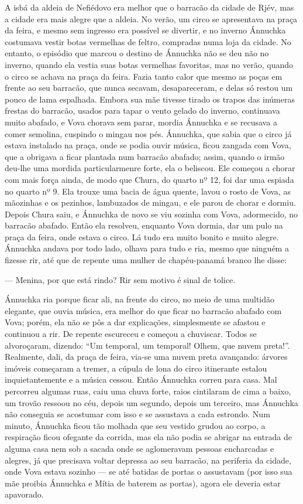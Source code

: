 A isbá da aldeia de Nefiédovo era melhor que o barracão da cidade de
Rjév, mas a cidade era mais alegre que a aldeia. No verão, um circo se
apresentava na praça da feira, e mesmo sem ingresso era possível se
divertir, e no inverno Ánnuchka costumava vestir botas vermelhas de
feltro, compradas numa loja da cidade. No entanto, o episódio que marcou
o destino de Ánnuchka não se deu não no inverno, quando ela vestia suas
botas vermelhas favoritas, mas no verão, quando o circo se achava na
praça da feira. Fazia tanto calor que mesmo as poças em frente ao seu
barracão, que nunca secavam, desapareceram, e delas só restou um pouco
de lama espalhada. Embora sua mãe tivesse tirado os trapos das inúmeras
frestas do barracão, usados para tapar o vento gelado do inverno,
continuava muito abafado, e Vova chorava sem parar, mordia Ánnuchka e se
recusava a comer semolina, cuspindo o mingau nos pés. Ánnuchka, que
sabia que o circo já estava instalado na praça, onde se podia ouvir
música, ficou zangada com Vova, que a obrigava a ficar plantada num
barracão abafado; assim, quando o irmão deu-lhe uma mordida
particularmenre forte, ela o beliscou. Ele começou a chorar com mais
força ainda, de modo que Chura, do quarto nº 12, foi dar uma espiada no
quarto nº 9. Ela trouxe uma bacia de água quente, lavou o rosto de Vova,
as mãozinhas e os pezinhos, lambuzados de mingau, e ele parou de chorar
e dormiu. Depois Chura saiu, e Ánnuchka de novo se viu sozinha com Vova,
adormecido, no barracão abafado. Então ela resolveu, enquanto Vova
dormia, dar um pulo na praça da feira, onde estava o circo. Lá tudo era
muito bonito e muito alegre. Ánnuchka andava por todo lado, olhava para
tudo e ria, mesmo que ninguém a fizesse rir, até que de repente uma
mulher de chapéu-panamá branco lhe disse:

--- Menina, por que está rindo? Rir sem motivo é sinal de tolice.

Ánnuchka ria porque ficar ali, na frente do circo, no meio de uma
multidão elegante, que ouvia música, era melhor do que ficar no barracão
abafado com Vova; porém, ela não se pôs a dar explicações, simplesmente
se afastou e continuou a rir. De repente escureceu e começou a
chuviscar. Todos se alvoroçaram, dizendo: ``Um temporal, um temporal!
Olhem, que nuvem preta!''. Realmente, dali, da praça de feira, via-se
uma nuvem preta avançando: árvores imóveis começaram a tremer, a cúpula
de lona do circo itinerante estalou inquietantemente e a música cessou.
Então Ánnuchka correu para casa. Mal percorreu algumas ruas, caiu uma
chuva forte, raios cintilaram de cima a baixo, um trovão ressoou no céu,
depois um segundo, depois um terceiro, mas Ánnuchka não conseguia se
acostumar com isso e se assustava a cada estrondo. Num minuto, Ánnuchka
ficou tão molhada que seu vestido grudou ao corpo, a respiração ficou
ofegante da corrida, mas ela não podia se abrigar na entrada de alguma
casa nem sob a sacada onde se aglomeravam pessoas encharcadas e alegres,
já que precisava voltar depressa ao seu barracão, na periferia da
cidade, onde Vova estava sozinho --- se até batidas de portas o
assustavam (por isso sua mãe proibia Ánnuchka e Mítia de baterem as
portas), agora ele deveria estar apavorado.

